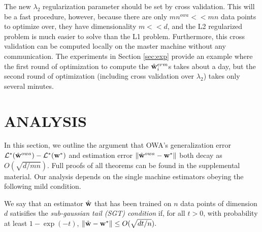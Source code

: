 \documentclass[thesis.tex]{subfiles}
\newcommand{\nowa}{n^{\textit{owa}}}
\begin{document}
\vspace{-0.05in}
The new $\lambda_2$ regularization parameter should be set by cross validation.
This will be a fast procedure, however, because there are only $m\nowa <\!\!< mn$ data points to optimize over,
they have dimensionality $m<\!\!<d$,
and the L2 regularized problem is much easier to solve than the L1 problem.
Furthermore, this cross validation can be computed locally on the master machine without any communication.
The experiments in Section \ref{sec:exp} provide an example where the first round of optimization to compute the $\hat{\mathbf w}^{erm}_i$s takes about a day, but the second round of optimization (including cross validation over $\lambda_2$) takes only several minutes.


\section{ANALYSIS}
\label{sec:anal}

In this section, we outline the argument that OWA's generalization error $\mathcal{L}^*(\hat{\mathbf w}^{owa})-\mathcal{L}^*({\mathbf w^{*}})$ and estimation error ${\lVert {\hat{\mathbf w}^{owa}-{\mathbf w^{*}}} \rVert}$ both decay as $O(\sqrt{d/mn})$.
Full proofs of all theorems can be found in the supplemental material.
%
Our analysis depends on the single machine estimators obeying the following mild condition.

\begin{definition}
We say that an estimator ${\hat{\mathbf w}}$ that has been trained on $n$ data points of dimension $d$ satisifies the \emph{sub-gaussian tail (SGT) condition} if,
for all $t>0$,
with probability at least $1-\exp(-t)$,
${\lVert {{\hat{\mathbf w}}-{\mathbf w^{*}}} \rVert} \le O( \sqrt{dt/n} ).$
\end{definition}
\end{document}

